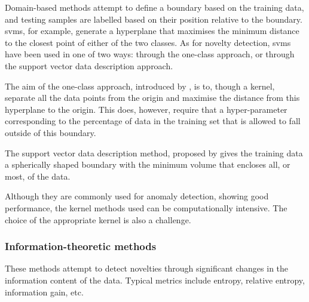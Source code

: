 Domain-based methods attempt to define a boundary based on the training data, and testing samples are labelled based on their position relative to the boundary. \glspl{svm}, for example, generate a hyperplane that maximises the minimum distance to the closest point of either of the two classes. As for novelty detection, \glspl{svm} have been used in one of two ways: through the one-class approach, or through the support vector data description approach.\par

The aim of the one-class approach, introduced by \cite{scholkopf1999}, is to, though a kernel, separate all the data points from the origin and maximise the distance from this hyperplane to the origin. This does, however, require that a hyper-parameter corresponding to the percentage of data in the training set that is allowed to fall outside of this boundary.\par

The support vector data description method, proposed by \cite{tax2004} gives the training data a spherically shaped boundary with the minimum volume that encloses all, or most, of the data.\par

Although they are commonly used for anomaly detection, showing good performance, the kernel methods used can be computationally intensive. The choice of the appropriate kernel is also a challenge.

\subsubsection{Information-theoretic methods}

These methods attempt to detect novelties through significant changes in the information content of the data. Typical metrics include entropy, relative entropy, information gain, etc.